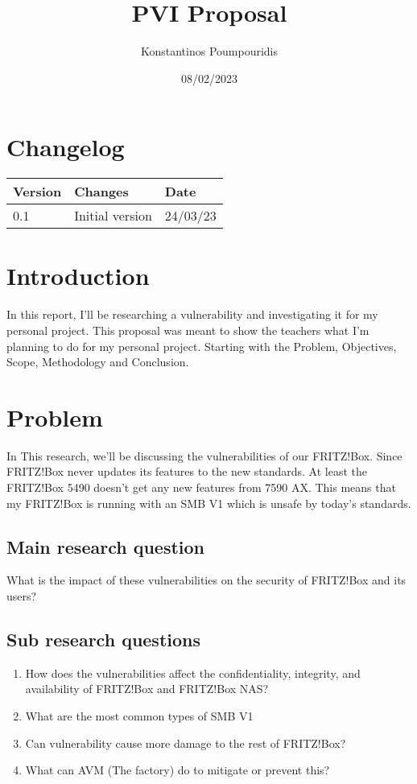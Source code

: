 \documentclass[12pt, letterpaper]{article}
\title{PVI Proposal}
\author{Konstantinos Poumpouridis}
\date{08/02/2023}
\begin{document}
\maketitle
\thispagestyle{empty}
    
\newpage
\section{Changelog}
    \begin{table}[htbp]
        \begin{tabular}{|l|l|l|}
            \hline
            Version & Changes         & Date   \tabularnewline \hline
            0.1     & Initial version & 24/03/23 \tabularnewline \hline
        \end{tabular}
    \end{table}
\newpage
\tableofcontents
\newpage
\section{Introduction}
In this report, I'll be researching a vulnerability and investigating it for my personal project. This proposal was meant to show the teachers what I'm planning to do for my personal project. Starting with the Problem, Objectives, Scope, Methodology and Conclusion.
\section{Problem}
In This research, we'll be discussing the vulnerabilities of our FRITZ!Box. Since FRITZ!Box never updates its features to the new standards. At least the FRITZ!Box 5490 doesn't get any new features from 7590 AX. This means that my FRITZ!Box is running with an SMB V1 which is unsafe by today's standards.
\subsection{Main research question}
What is the impact of these vulnerabilities on the security of FRITZ!Box and its users?

\subsection{Sub research questions}
\begin{enumerate}
    \item How does the vulnerabilities affect the confidentiality, integrity, and availability of FRITZ!Box and FRITZ!Box NAS?
    \item What are the most common types of SMB V1 
    \item Can vulnerability cause more damage to the rest of FRITZ!Box?
    \item What can AVM (The factory) do to mitigate or prevent this?
\end{enumerate}
\end{document}
